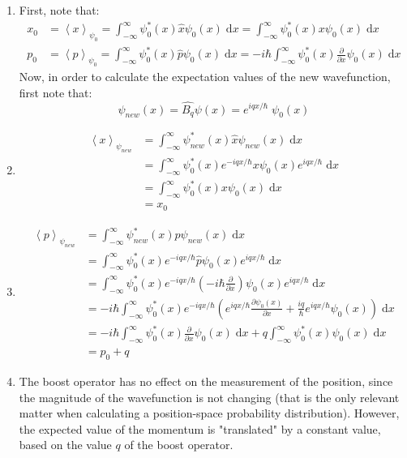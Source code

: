 \begin{sol}
\begin{enumerate}[label=\textbf{(\alph*)}]
\item First, note that:
\begin{align*}
    x_0 &= \left<x\right>_{\psi_0} = \int_{-\infty}^{\infty}\psi_0^*(x)\hat{x}\psi_0(x)\;\mathrm{d}x = \int_{-\infty}^{\infty}\psi_0^*(x)x\psi_0(x)\;\mathrm{d}x \\ p_0 &= \left<p\right>_{\psi_0} = \int_{-\infty}^{\infty}\psi_0^*(x)\hat{p}\psi_0(x)\;\mathrm{d}x = -i\hbar\int_{-\infty}^{\infty}\psi_0^*(x)\frac{\partial}{\partial x}\psi_0(x)\;\mathrm{d}x
\end{align*}
Now, in order to calculate the expectation values of the new wavefunction, first note that: $$\psi_{new}(x) = \hat{B_q}\psi(x) = e^{iqx/\hbar}\;\psi_0(x)$$\item
\begin{align*}
\left<x\right>_{\psi_{new}} &= \int_{-\infty}^{\infty}\psi_{new}^*(x)\hat{x}\psi_{new}(x) \;\mathrm{d}x \\ &= \int_{-\infty}^{\infty}\psi_0^*(x)e^{-iqx/\hbar}x\psi_0(x)e^{iqx/\hbar}\;\mathrm{d}x \\ &= \int_{-\infty}^{\infty}\psi_0^*(x)x\psi_0(x)\;\mathrm{d}x \\ &= x_0
\end{align*}
\item
\begin{align*}
\left<p\right>_{\psi_{new}} &= \int_{-\infty}^{\infty}\psi_{new}^*(x)\hat{p}\psi_{new}(x) \;\mathrm{d}x \\ &= \int_{-\infty}^{\infty}\psi_0^*(x)e^{-iqx/\hbar}\hat{p}\psi_0(x)e^{iqx/\hbar}\;\mathrm{d}x \\ &= \int_{-\infty}^{\infty}\psi_0^*(x)e^{-iqx/\hbar}(-i\hbar\frac{\partial}{\partial x})\psi_0(x)e^{iqx/\hbar}\;\mathrm{d}x \\ &= -i\hbar\int_{-\infty}^{\infty}\psi_0^*(x)e^{-iqx/\hbar}(e^{iqx/\hbar}\frac{\partial \psi_0(x)}{\partial x} + \frac{iq}{\hbar}e^{iqx/\hbar}\psi_0(x))\;\mathrm{d}x \\ &= -i\hbar\int_{-\infty}^{\infty}\psi_0^*(x)\frac{\partial}{\partial x}\psi_0(x)\;\mathrm{d}x + q\int_{-\infty}^{\infty}\psi_0^*(x)\psi_0(x)\;\mathrm{d}x \\ &= p_0 + q
\end{align*}
\item The boost operator has no effect on the measurement of the position, since the magnitude of the wavefunction is not changing (that is the only relevant matter when calculating a position-space probability distribution). However, the expected value of the momentum is "translated" by a constant value, based on the value $q$ of the boost operator.

\end{enumerate}
\end{sol}
